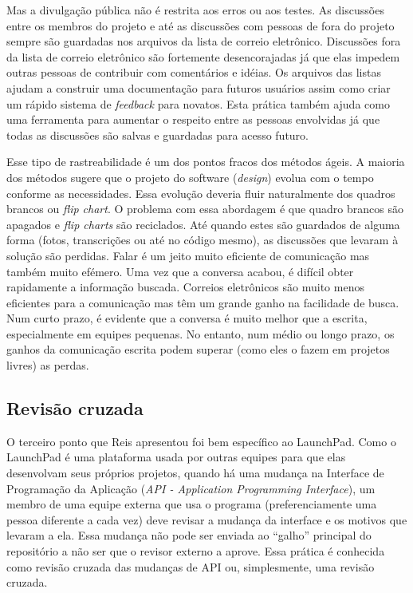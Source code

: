 Mas a divulgação pública não é restrita aos erros ou aos testes. As
discussões entre os membros do projeto e até as discussões com pessoas
de fora do projeto sempre são guardadas nos arquivos da lista de
correio eletrônico. Discussões fora da lista de correio eletrônico são
fortemente desencorajadas já que elas impedem outras pessoas de
contribuir com comentários e idéias. Os arquivos das listas ajudam a
construir uma documentação para futuros usuários assim como criar um
rápido sistema de \emph{feedback} para novatos. Esta prática também
ajuda como uma ferramenta para aumentar o respeito entre as pessoas
envolvidas já que todas as discussões são salvas e guardadas para
acesso futuro.

Esse tipo de rastreabilidade é um dos pontos fracos dos métodos
ágeis. A maioria dos métodos sugere que o projeto do software
(\emph{design}) evolua com o tempo conforme as necessidades. Essa
evolução deveria fluir naturalmente dos quadros brancos ou \emph{flip
  chart}. O problema com essa abordagem é que quadro brancos são
apagados e \emph{flip charts} são reciclados.  Até quando estes são
guardados de alguma forma (fotos, transcrições ou até no código
mesmo), as discussões que levaram à solução são perdidas. Falar é um
jeito muito eficiente de comunicação mas também muito efémero. Uma vez
que a conversa acabou, é difícil obter rapidamente a informação
buscada. Correios eletrônicos são muito menos eficientes para a
comunicação mas têm um grande ganho na facilidade de busca. Num curto
prazo, é evidente que a conversa é muito melhor que a escrita,
especialmente em equipes pequenas. No entanto, num médio ou longo
prazo, os ganhos da comunicação escrita podem superar (como eles o
fazem em projetos livres) as perdas.

\subsection{Revisão cruzada}
\label{subsec:crossrev}

O terceiro ponto que Reis apresentou foi bem específico ao
LaunchPad. Como o LaunchPad é uma plataforma usada por outras equipes
para que elas desenvolvam seus próprios projetos, quando há uma
mudança na Interface de Programação da Aplicação (\emph{API -
  Application Programming Interface}), um membro de uma equipe externa
que usa o programa (preferenciamente uma pessoa diferente a cada vez)
deve revisar a mudança da interface e os motivos que levaram a
ela. Essa mudança não pode ser enviada ao ``galho'' principal do
repositório a não ser que o revisor externo a aprove. Essa prática é
conhecida como revisão cruzada das mudanças de API ou, simplesmente,
uma revisão cruzada.

